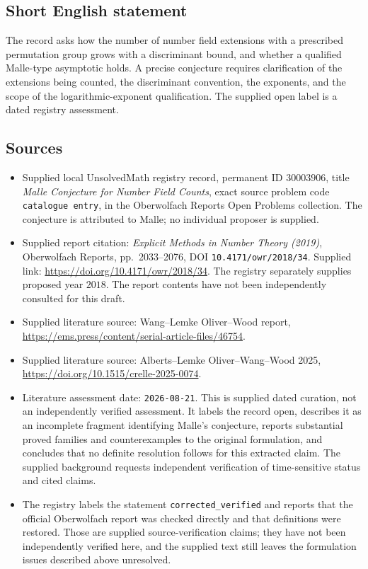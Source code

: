 \documentclass[11pt]{article}
\begin{document}
\subsection{Short English statement}
The record asks how the number of number field extensions with a prescribed permutation group grows with a discriminant bound, and whether a qualified Malle-type asymptotic holds. A precise conjecture requires clarification of the extensions being counted, the discriminant convention, the exponents, and the scope of the logarithmic-exponent qualification. The supplied open label is a dated registry assessment.
\subsection{Sources}
\begin{itemize}
\item Supplied local UnsolvedMath registry record, permanent ID \(30003906\), title \emph{Malle Conjecture for Number Field Counts}, exact source problem code \texttt{catalogue entry}, in the Oberwolfach Reports Open Problems collection. The conjecture is attributed to Malle; no individual proposer is supplied.
\item Supplied report citation: \emph{Explicit Methods in Number Theory (2019)}, Oberwolfach Reports, pp.\ 2033--2076, DOI \texttt{10.4171/owr/2018/34}. Supplied link: \url{https://doi.org/10.4171/owr/2018/34}. The registry separately supplies proposed year \(2018\). The report contents have not been independently consulted for this draft.
\item Supplied literature source: Wang--Lemke Oliver--Wood report, \url{https://ems.press/content/serial-article-files/46754}.
\item Supplied literature source: Alberts--Lemke Oliver--Wang--Wood 2025, \url{https://doi.org/10.1515/crelle-2025-0074}.
\item Literature assessment date: \texttt{2026-08-21}. This is supplied dated curation, not an independently verified assessment. It labels the record open, describes it as an incomplete fragment identifying Malle's conjecture, reports substantial proved families and counterexamples to the original formulation, and concludes that no definite resolution follows for this extracted claim. The supplied background requests independent verification of time-sensitive status and cited claims.
\item The registry labels the statement \texttt{corrected\_verified} and reports that the official Oberwolfach report was checked directly and that definitions were restored. Those are supplied source-verification claims; they have not been independently verified here, and the supplied text still leaves the formulation issues described above unresolved.
\end{itemize}
\end{document}
